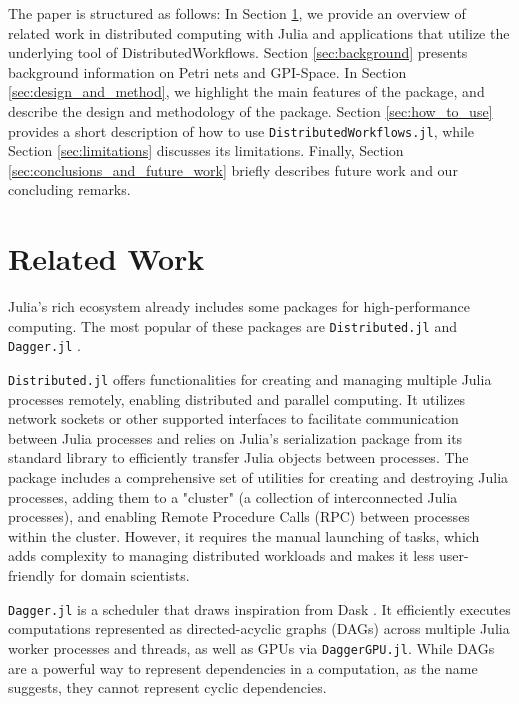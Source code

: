 \documentclass{juliacon}
\begin{document}
The paper is structured as follows:
In Section \ref{sec:related_work}, we provide an overview of related work in distributed computing with Julia and applications that utilize the underlying tool of DistributedWorkflows.
Section \ref{sec:background} presents background information on Petri nets and GPI-Space. 
In Section \ref{sec:design_and_method}, we highlight the main features of the package, and describe the design and methodology of the package.
Section \ref{sec:how_to_use} provides a short description of how to use \texttt{DistributedWorkflows.jl}, while Section \ref{sec:limitations} discusses its limitations. 
Finally, Section \ref{sec:conclusions_and_future_work} briefly describes future work and our concluding remarks.


\section{Related Work}
\label{sec:related_work}

Julia's rich ecosystem already includes some packages for high-performance computing.
The most popular of these packages are \texttt{Distributed.jl} \cite{Distributedjl} and \texttt{Dagger.jl} \cite{dagger1, dagger2}.\vskip 6pt

\texttt{Distributed.jl} offers functionalities for creating and managing multiple Julia processes remotely, enabling distributed and parallel computing. 
It utilizes network sockets or other supported interfaces to facilitate communication between Julia processes and relies on Julia’s serialization package from its standard library to efficiently transfer Julia objects between processes. 
The package includes a comprehensive set of utilities for creating and destroying Julia processes, adding them to a "cluster" (a collection of interconnected Julia processes), and enabling Remote Procedure Calls (RPC) between processes within the cluster. 
However, it requires the manual launching of tasks, which adds complexity to managing distributed workloads and makes it less user-friendly for domain scientists.\vskip 6pt

\texttt{Dagger.jl} is a scheduler that draws inspiration from Dask \cite{dask}. 
It efficiently executes computations represented as directed-acyclic graphs (DAGs) across multiple Julia worker processes and threads, as well as GPUs via \texttt{DaggerGPU.jl}. 
While DAGs are a powerful way to represent dependencies in a computation, as the name suggests, they cannot represent cyclic dependencies.\vskip 6pt
\end{document}
